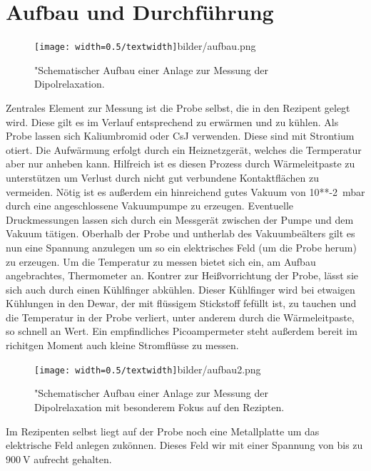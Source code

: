 \section{Aufbau und Durchführung}
\begin{figure}
    \centering
    \texttt{[image: width=0.5/textwidth]}{bilder/aufbau.png}
    \caption{"Schematischer Aufbau einer Anlage zur Messung der Dipolrelaxation.
            \cite{skript}}
    \label{fig:aufbau}
\end{figure}

Zentrales Element zur Messung ist die Probe selbst, die in den Rezipent gelegt wird. Diese gilt es im Verlauf entsprechend
zu erwärmen und zu kühlen. Als Probe lassen sich Kaliumbromid oder CsJ verwenden. Diese sind mit Strontium
otiert. Die Aufwärmung erfolgt durch ein Heiznetzgerät, welches die Termperatur aber nur anheben kann.
Hilfreich ist es diesen Prozess durch Wärmeleitpaste zu unterstützen um
Verlust durch nicht gut verbundene Kontaktflächen zu vermeiden.
Nötig ist es außerdem ein hinreichend gutes Vakuum von \SI{10**-2}{\milli\bar} durch eine angeschlossene Vakuumpumpe zu erzeugen.
Eventuelle Druckmessungen  lassen sich durch ein Messgerät zwischen der Pumpe und dem Vakuum tätigen.
Oberhalb der Probe und untherlab des Vakuumbeälters gilt es nun eine Spannung anzulegen um so ein 
elektrisches Feld (um die Probe herum) zu erzeugen. Um die Temperatur zu messen bietet sich ein, am Aufbau angebrachtes, Thermometer an.
Kontrer zur Heißvorrichtung der Probe, lässt sie sich auch durch einen Kühlfinger abkühlen.
Dieser Kühlfinger wird bei etwaigen Kühlungen in den Dewar, 
der mit flüssigem Stickstoff fefüllt ist, 
zu tauchen und die Temperatur in der Probe verliert, unter anderem durch die Wärmeleitpaste, so schnell an Wert.
Ein empfindliches Picoampermeter steht außerdem bereit im richitgen Moment auch kleine
Stromflüsse zu messen.

\begin{figure}
    \centering
    \texttt{[image: width=0.5/textwidth]}{bilder/aufbau2.png}
    \caption{"Schematischer Aufbau einer Anlage zur Messung der Dipolrelaxation mit 
            besonderem Fokus auf den Rezipten.
            \cite{skript}}
    \label{fig:aufbau2}
\end{figure}


Im Rezipenten selbst liegt auf der Probe noch eine Metallplatte um das elektrische Feld anlegen zukönnen.
Dieses Feld wir mit einer Spannung von bis zu $\SI{900}{\volt}$ aufrecht gehalten.
\\
\newline
